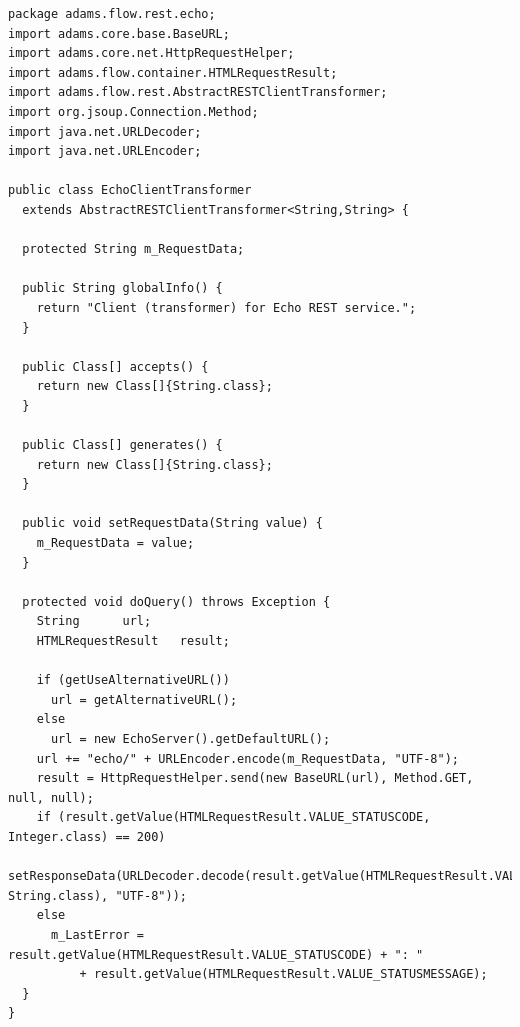 \documentclass[a4paper]{book}
\begin{document}
{\scriptsize
\begin{verbatim}
package adams.flow.rest.echo;
import adams.core.base.BaseURL;
import adams.core.net.HttpRequestHelper;
import adams.flow.container.HTMLRequestResult;
import adams.flow.rest.AbstractRESTClientTransformer;
import org.jsoup.Connection.Method;
import java.net.URLDecoder;
import java.net.URLEncoder;

public class EchoClientTransformer
  extends AbstractRESTClientTransformer<String,String> {

  protected String m_RequestData;

  public String globalInfo() {
    return "Client (transformer) for Echo REST service.";
  }

  public Class[] accepts() {
    return new Class[]{String.class};
  }

  public Class[] generates() {
    return new Class[]{String.class};
  }

  public void setRequestData(String value) {
    m_RequestData = value;
  }

  protected void doQuery() throws Exception {
    String		url;
    HTMLRequestResult 	result;

    if (getUseAlternativeURL())
      url = getAlternativeURL();
    else
      url = new EchoServer().getDefaultURL();
    url += "echo/" + URLEncoder.encode(m_RequestData, "UTF-8");
    result = HttpRequestHelper.send(new BaseURL(url), Method.GET, null, null);
    if (result.getValue(HTMLRequestResult.VALUE_STATUSCODE, Integer.class) == 200)
      setResponseData(URLDecoder.decode(result.getValue(HTMLRequestResult.VALUE_BODY, String.class), "UTF-8"));
    else
      m_LastError = result.getValue(HTMLRequestResult.VALUE_STATUSCODE) + ": "
          + result.getValue(HTMLRequestResult.VALUE_STATUSMESSAGE);
  }
}
\end{verbatim}}
\end{document}
